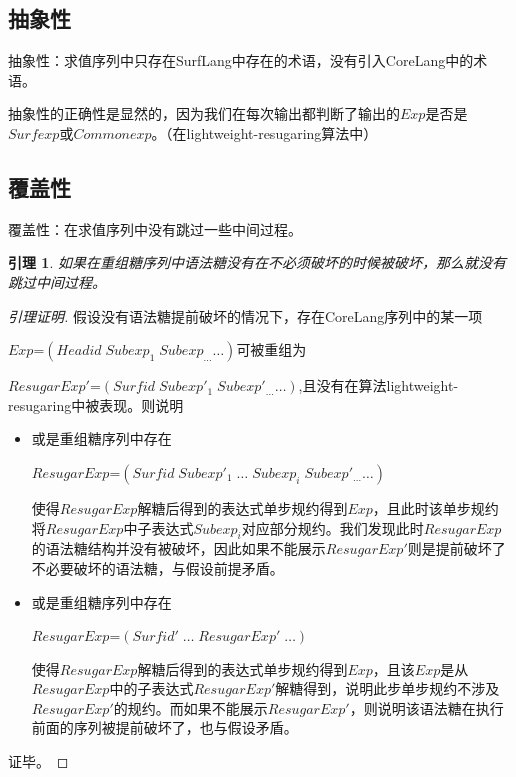 



\subsection{抽象性}
抽象性：求值序列中只存在SurfLang中存在的术语，没有引入CoreLang中的术语。

抽象性的正确性是显然的，因为我们在每次输出都判断了输出的$Exp$是否是$Surfexp$或$Commonexp$。（在lightweight-resugaring算法中）

\subsection{覆盖性}
覆盖性：在求值序列中没有跳过一些中间过程。

\newtheorem{lemma}{引理}[section]

\begin{lemma}
	如果在重组糖序列中语法糖没有在不必须破坏的时候被破坏，那么就没有跳过中间过程。
\end{lemma}

\begin{proof}[引理证明]
	假设没有语法糖提前破坏的情况下，存在CoreLang序列中的某一项
	
	$Exp$=$(Headid\;Subexp_{1}\;Subexp_{\ldots} \ldots)$可被重组为
	
	$ResugarExp'$=$(Surfid\;Subexp'_{1}\;Subexp'_{\ldots}\ldots)$,且没有在算法lightweight-resugaring中被表现。则说明
	\begin{itemize}
		\item 或是重组糖序列中存在
		
		$ResugarExp$=$(Surfid\;Subexp'_{1}\;\ldots\;Subexp_{i}\;Subexp'_{\ldots}\ldots)$
		
		使得$ResugarExp$解糖后得到的表达式单步规约得到$Exp$，且此时该单步规约将$ResugarExp$中子表达式$Subexp_{i}$对应部分规约。我们发现此时$ResugarExp$的语法糖结构并没有被破坏，因此如果不能展示$ResugarExp'$则是提前破坏了不必要破坏的语法糖，与假设前提矛盾。
		
		\item 或是重组糖序列中存在
		
		$ResugarExp$=$(Surfid'\;\ldots\;ResugarExp'\;\ldots)$
		
		使得$ResugarExp$解糖后得到的表达式单步规约得到$Exp$，且该$Exp$是从$ResugarExp$中的子表达式$ResugarExp'$解糖得到，说明此步单步规约不涉及$ResugarExp'$的规约。而如果不能展示$ResugarExp'$，则说明该语法糖在执行前面的序列被提前破坏了，也与假设矛盾。

	\end{itemize}

证毕。
\end{proof}


